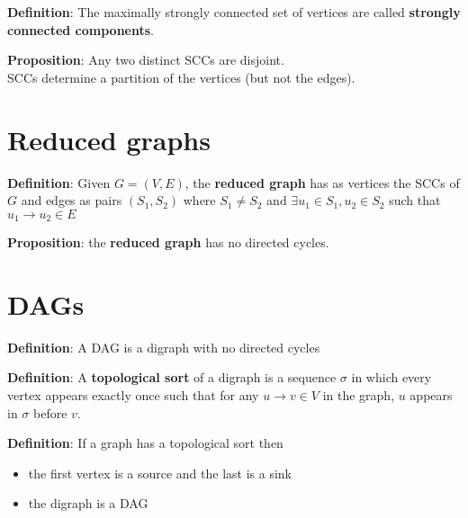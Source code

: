 \begin{framed}
   \textbf{Definition}: The maximally strongly connected set of vertices are called \textbf{strongly connected components}. 
\end{framed}

\begin{framed}
   \textbf{Proposition}: Any two distinct SCCs are disjoint.  \\

SCCs determine a partition of the vertices (but not the edges).  
\end{framed}

\section{Reduced graphs}
\begin{framed}
   \textbf{Definition}: Given $G = (V, E)$, the \textbf{reduced graph} has as vertices the SCCs of $G$ and edges as pairs $(S_1, S_2) $ where $S_1 \neq S_2$ and $\exists u_1 \in S_1, u_2 \in S_2$ such that $u_1 \rightarrow u_2 \in E$
\end{framed}

\begin{framed}
   \textbf{Proposition}: the \textbf{reduced graph} has no directed cycles. 
\end{framed}

\section{DAGs}
\begin{framed}
   \textbf{Definition}: A DAG is a digraph with no directed cycles
\end{framed}

\begin{framed}
   \textbf{Definition}: A \textbf{topological sort} of a digraph is a sequence $\sigma$ in which every vertex appears exactly once such that for any $u \rightarrow v \in V$ in the graph,  $u$ appears in $\sigma$ before  $v$. 
\end{framed}

\begin{framed}
   \textbf{Definition}: If a graph has a topological sort then
   \begin{itemize}
      \item the first vertex is a source and the last is a sink 
      \item the digraph is a DAG
   \end{itemize}
\end{framed}


